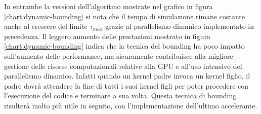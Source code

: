 In entrambe la versioni dell'algoritmo mostrate nel grafico in figura
\ref{chart:dynamic-bounding} si nota che il tempo di simulazione
rimane costante anche al crescere del limite $\tau_{max}$ grazie al parallelismo
dinamico implementato in precedenza.
Il leggero aumento delle prestazioni mostrato in figura
\ref{chart:dynamic-bounding} indica che la tecnica
del bounding ha poco impatto sull'aumento delle performance, ma
sicuramente contribuisce alla migliore gestione delle risorse computazionali
relative alla GPU e all'uso intensivo del parallelismo dinamico. Infatti
quando un kernel padre invoca un kernel figlio,
il padre dovrà attendere la fine di tutti i suoi kernel figli per
poter procedere con l'esecuzione del codice e terminare a sua volta.
Questa tecnica di bounding risulterà molto più utile in seguito, con
l'implementazione dell'ultimo accelerante.

